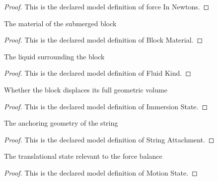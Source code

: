 \begin{proof}
  This is the declared model definition of force In Newtons.
\end{proof}
\begin{definition}
  \label{def:physics:phyx-mini-0722:phyxminiproblems-problemphyxmini0722-blockmaterial}
  The material of the submerged block
\end{definition}
\begin{proof}
  This is the declared model definition of Block Material.
\end{proof}
\begin{definition}
  \label{def:physics:phyx-mini-0722:phyxminiproblems-problemphyxmini0722-fluidkind}
  The liquid surrounding the block
\end{definition}
\begin{proof}
  This is the declared model definition of Fluid Kind.
\end{proof}
\begin{definition}
  \label{def:physics:phyx-mini-0722:phyxminiproblems-problemphyxmini0722-immersionstate}
  Whether the block displaces its full geometric volume
\end{definition}
\begin{proof}
  This is the declared model definition of Immersion State.
\end{proof}
\begin{definition}
  \label{def:physics:phyx-mini-0722:phyxminiproblems-problemphyxmini0722-stringattachment}
  The anchoring geometry of the string
\end{definition}
\begin{proof}
  This is the declared model definition of String Attachment.
\end{proof}
\begin{definition}
  \label{def:physics:phyx-mini-0722:phyxminiproblems-problemphyxmini0722-motionstate}
  The translational state relevant to the force balance
\end{definition}
\begin{proof}
  This is the declared model definition of Motion State.
\end{proof}
